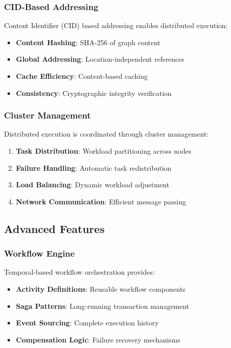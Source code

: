 \documentclass[11pt,a4paper]{article}
\begin{document}
\subsubsection{CID-Based Addressing}
\label{subsubsec:cid_addressing}

Content Identifier (CID) based addressing enables distributed execution:

\begin{itemize}
\item \textbf{Content Hashing}: SHA-256 of graph content
\item \textbf{Global Addressing}: Location-independent references
\item \textbf{Cache Efficiency}: Content-based caching
\item \textbf{Consistency}: Cryptographic integrity verification
\end{itemize}

\subsubsection{Cluster Management}
\label{subsubsec:cluster_management}

Distributed execution is coordinated through cluster management:

\begin{enumerate}
\item \textbf{Task Distribution}: Workload partitioning across nodes
\item \textbf{Failure Handling}: Automatic task redistribution
\item \textbf{Load Balancing}: Dynamic workload adjustment
\item \textbf{Network Communication}: Efficient message passing
\end{enumerate}

\subsection{Advanced Features}
\label{subsec:advanced_features}

\subsubsection{Workflow Engine}
\label{subsubsec:workflow_engine}

Temporal-based workflow orchestration provides:

\begin{itemize}
\item \textbf{Activity Definitions}: Reusable workflow components
\item \textbf{Saga Patterns}: Long-running transaction management
\item \textbf{Event Sourcing}: Complete execution history
\item \textbf{Compensation Logic}: Failure recovery mechanisms
\end{itemize}
\end{document}
